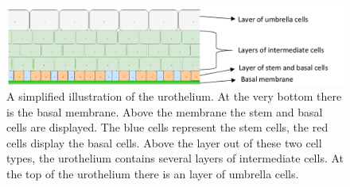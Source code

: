 \begin{figure}
	\center
	\includegraphics[scale=0.3]{figures/Urothelium.png}
	\caption{A simplified illustration of the urothelium. At the very bottom there is the basal membrane. Above the membrane the stem and basal cells are displayed. The blue cells represent the stem cells, the red cells display the basal cells. Above the layer out of these two cell types, the urothelium contains several layers of intermediate cells. At the top of the urothelium there is an layer of umbrella cells.}
	\label{img:physiology_urothelium}
\end{figure}

